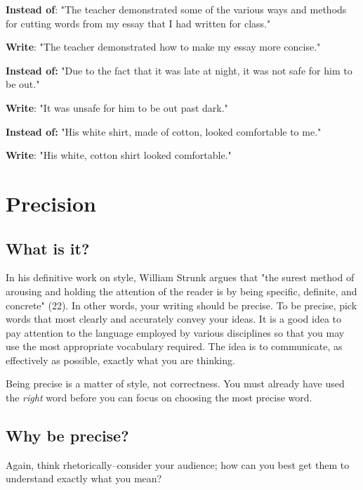 \begin{enumerate}
    	\textbf{Instead of}:  	"The teacher demonstrated some of the various ways and methods
                               	for cutting words from my essay that I had written for class."
 
    	\textbf{Write}:           	"The teacher demonstrated how to make my essay more concise."
 
    	\textbf{Instead of:}  	"Due to the fact that it was late at night, it was not safe for him to
                                	be out."
 
    	\textbf{Write}:                    	"It was unsafe for him to be out past dark."
 
 
    	\textbf{Instead of:}  	"His white shirt, made of cotton, looked comfortable to me."
 
    	\textbf{Write}:        	          	"His white, cotton shirt looked comfortable."

\end{enumerate}

\chapter{Precision}
 
\section{What is it?}
 
In his definitive work on style, William Strunk argues that "the surest method of 
arousing and holding the attention of the reader is by being specific, definite, and 
concrete" (22). In other words, your writing should be precise. To be precise, pick 
words that most clearly and accurately convey your ideas.  It is a good idea to pay 
attention to the language employed by various disciplines so that you may use the 
most appropriate vocabulary required. The idea is to communicate, as effectively as 
possible, exactly what you are thinking.
 
Being precise is a matter of style, not correctness. You must already have used the 
\emph{right} word before you can focus on choosing the most precise word.
 
\section{Why be precise?}
 
Again, think rhetorically--consider your audience; how can you best get them to 
understand exactly what you mean?
 
